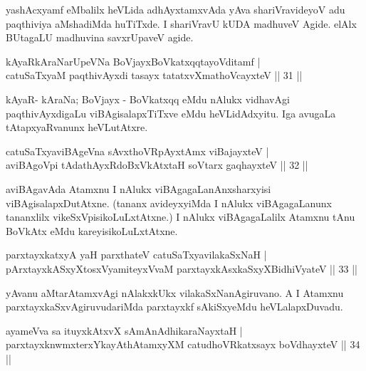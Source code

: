 \begin{artha}
yashAcxyamf eMbalilx heVLida adhAyxtamxvAda yAva shariVravideyoV adu paqthiviya aMshadiMda huTiTxde. I shariVravU kUDA madhuveV Agide. elAlx BUtagaLU madhuvina savxrUpaveV agide. 
\end{artha}
\begin{shl}
kAyaRkAraNarUpeVNa BoVjayxBoVkatxqqtayoVditamf |\\
catuSaTxyaM paqthivAyxdi tasayx tatatxvXmathoVcayxteV \hfill || 31 || 
\end{shl}
\begin{artha}
kAyaR- kAraNa; BoVjayx - BoVkatxqq eMdu nAlukx vidhavAgi paqthivAyxdigaLu viBAgisalapxTiTxve eMdu heVLidAdxyitu. Iga avugaLa tAtapxyaRvanunx heVLutAtxre.
\end{artha}
\begin{shl}
catuSaTxyaviBAgeVna sAvxthoVR\s pAyxtAmx viBajayxteV |\\
aviBAgoV\s pi tAdathAyxRdoBxVkAtx\s taH soV\s tarx gaqhayxteV \hfill || 32 ||
\end{shl}
\begin{artha}
aviBAgavAda Atamxnu I nAlukx viBAgagaLanAnxsharxyisi viBAgisalapxDutAtxne. (tananx avideyxyiMda I nAlukx viBAgagaLanunx tananxlilx vikeSxVpisikoLuLxtAtxne.) I nAlukx viBAgagaLalilx Atamxnu tAnu BoVkAtx eMdu kareyisikoLuLxtAtxne.
\end{artha}

\begin{shl}
parxtayxkatxyA yaH parxthateV \footnotemark[1]catuSaTxyavilakaSxNaH |\\
pArxtayxkASxyXtosxV\s yamiteyxVvaM parxtayxkAsxkaSxyXBidhiVyateV \hfill || 33 ||
\end{shl}

\begin{artha}
yAvanu aMtarAtamxvAgi nAlakxkUkx vilakaSxNanAgiruvano. A I Atamxnu parxtayxkaSxvAgiruvudariMda parxtayxkf sAkiSxyeMdu heVLalapxDuvadu.
\end{artha}

\begin{shl}
ayameVva sa ituyxkAtxvX \footnotemark[2]sAmAnAdhikaraNayxtaH |\\
parxtayxknwmxterxYkayAthAtamxyXM catudhoVRkatxsayx boVdhayxteV \hfill || 34 ||
\end{shl}

